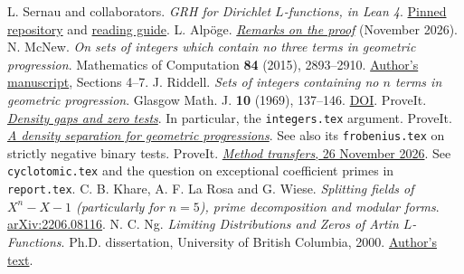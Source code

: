 \documentclass[11pt,letterpaper]{article}
\newcommand{\upsrc}[2]{\href{https://github.com/lsernau/grh-lean/blob/72fead102f663d5c7a407964a13dc0cf9d977207/grh/#1}{#2}}
\newcommand{\prsrc}[2]{\href{https://github.com/VladimirReshetnikov/ProveIt/blob/a1d43d8a32add57d596273e04648bc96a0a9bc0d/docs/incoming/#1}{#2}}
\begin{document}
\begin{thebibliography}{9}
 L. Sernau and collaborators. \emph{GRH for Dirichlet $L$-functions, in Lean 4}. \href{https://github.com/lsernau/grh-lean/tree/72fead102f663d5c7a407964a13dc0cf9d977207}{Pinned repository} and \upsrc{GUIDE.md}{reading guide}.
 L. Alp\"oge. \href{https://alpo.ge/remark.pdf}{\emph{Remarks on the proof}} (November 2026).
 N. McNew. \emph{On sets of integers which contain no three terms in geometric progression}. Mathematics of Computation \textbf{84} (2015), 2893--2910. \href{https://www.nathanmcnew.com/GPFsets.pdf}{Author's manuscript}, Sections 4--7.
 J. Riddell. \emph{Sets of integers containing no $n$ terms in geometric progression}. Glasgow Math. J. \textbf{10} (1969), 137--146. \href{https://doi.org/10.1017/S0017089500000690}{DOI}.
 ProveIt. \prsrc{grh_transfers_density_gaps_and_zero_tests.zip}{\emph{Density gaps and zero tests}}. In particular, the \texttt{integers.tex} argument.
 ProveIt. \prsrc{mcnew_density_and_grh_transfers.zip}{\emph{A density separation for geometric progressions}}. See also its \texttt{frobenius.tex} on strictly negative binary tests.
 ProveIt. \prsrc{grh_method_transfers_2026-11-26.zip}{\emph{Method transfers}, 26 November 2026}. See \texttt{cyclotomic.tex} and the question on exceptional coefficient primes in \texttt{report.tex}.
 C. B. Khare, A. F. La Rosa and G. Wiese. \emph{Splitting fields of $X^n-X-1$ (particularly for $n=5$), prime decomposition and modular forms}. \href{https://arxiv.org/abs/2206.08116}{arXiv:2206.08116}.
 N. C. Ng. \emph{Limiting Distributions and Zeros of Artin $L$-Functions}. Ph.D. dissertation, University of British Columbia, 2000. \href{https://www.cs.uleth.ca/~nathanng/RESEARCH/phd.thesis.pdf}{Author's text}.
\end{thebibliography}
\end{document}
